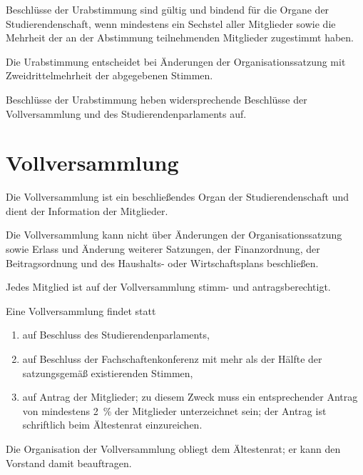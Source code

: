 Beschlüsse der Urabstimmung sind gültig und bindend für die Organe der Studierendenschaft, wenn mindestens ein Sechstel aller Mitglieder sowie die Mehrheit der an der Abstimmung teilnehmenden Mitglieder zugestimmt haben. 

Die Urabstimmung entscheidet bei Änderungen der Organisationssatzung mit Zweidrittelmehrheit der abgegebenen Stimmen. 

Beschlüsse der Urabstimmung heben widersprechende Beschlüsse der Vollversammlung und des Studierendenparlaments auf.

%
%

\parnumberfalse \section{Vollversammlung} \parnumbertrue


Die Vollversammlung ist ein beschließendes Organ der Studierendenschaft und dient der Information der Mitglieder. 

Die Vollversammlung kann nicht über Änderungen der Organisationssatzung sowie Erlass und Änderung weiterer Satzungen, der Finanzordnung, der Beitragsordnung und des Haushalts- oder Wirtschaftsplans beschließen.


\parnumberfalse Jedes Mitglied ist auf der Vollversammlung stimm- und antragsberechtigt.\parnumbertrue

 \label{vv:zustandekommen}

\parnumberfalse Eine Vollversammlung findet statt
\begin{enumerate}
\item auf Beschluss des Studierendenparlaments,
\item auf Beschluss der Fachschaftenkonferenz mit mehr als der Hälfte der satzungsgemäß existierenden Stimmen,
\item \label{vv:zustandekommen:mitglieder}auf Antrag der Mitglieder; zu diesem Zweck muss ein entsprechender Antrag von mindestens 2~\% der Mitglieder unterzeichnet sein; der Antrag ist schriftlich beim Ältestenrat einzureichen.
\end{enumerate} \parnumbertrue


\label{vv:organisation}

Die Organisation der Vollversammlung obliegt dem Ältestenrat; er kann den Vorstand damit beauftragen.

